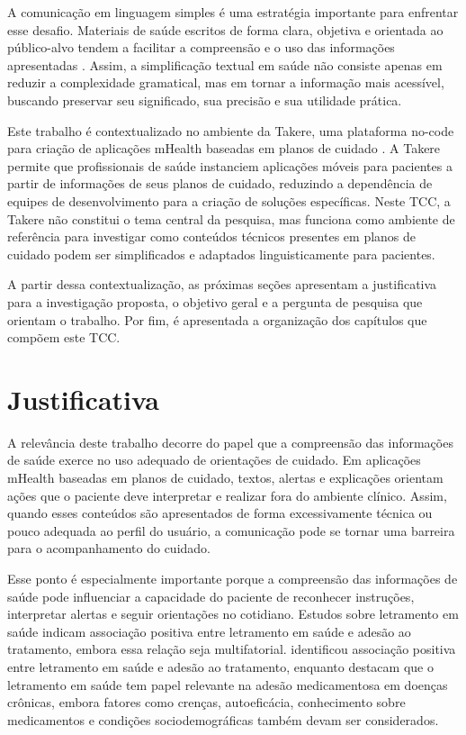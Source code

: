 A comunicação em linguagem simples é uma estratégia importante para enfrentar esse desafio. Materiais de saúde escritos de forma clara, objetiva e orientada ao público-alvo tendem a facilitar a compreensão e o uso das informações apresentadas \cite{cdc2025plainlanguage}. Assim, a simplificação textual em saúde não consiste apenas em reduzir a complexidade gramatical, mas em tornar a informação mais acessível, buscando preservar seu significado, sua precisão e sua utilidade prática.

Este trabalho é contextualizado no ambiente da Takere, uma plataforma no-code para criação de aplicações mHealth baseadas em planos de cuidado \cite{niemiec2022takere}. A Takere permite que profissionais de saúde instanciem aplicações móveis para pacientes a partir de informações de seus planos de cuidado, reduzindo a dependência de equipes de desenvolvimento para a criação de soluções específicas. Neste TCC, a Takere não constitui o tema central da pesquisa, mas funciona como ambiente de referência para investigar como conteúdos técnicos presentes em planos de cuidado podem ser simplificados e adaptados linguisticamente para pacientes.

A partir dessa contextualização, as próximas seções apresentam a justificativa para a investigação proposta, o objetivo geral e a pergunta de pesquisa que orientam o trabalho. Por fim, é apresentada a organização dos capítulos que compõem este TCC.

\section{Justificativa}
\label{sec:justificativa}

A relevância deste trabalho decorre do papel que a compreensão das informações de saúde exerce no uso adequado de orientações de cuidado. Em aplicações mHealth baseadas em planos de cuidado, textos, alertas e explicações orientam ações que o paciente deve interpretar e realizar fora do ambiente clínico. Assim, quando esses conteúdos são apresentados de forma excessivamente técnica ou pouco adequada ao perfil do usuário, a comunicação pode se tornar uma barreira para o acompanhamento do cuidado.

Esse ponto é especialmente importante porque a compreensão das informações de saúde pode influenciar a capacidade do paciente de reconhecer instruções, interpretar alertas e seguir orientações no cotidiano. Estudos sobre letramento em saúde indicam associação positiva entre letramento em saúde e adesão ao tratamento, embora essa relação seja multifatorial.  identificou associação positiva entre letramento em saúde e adesão ao tratamento, enquanto  destacam que o letramento em saúde tem papel relevante na adesão medicamentosa em doenças crônicas, embora fatores como crenças, autoeficácia, conhecimento sobre medicamentos e condições sociodemográficas também devam ser considerados.

